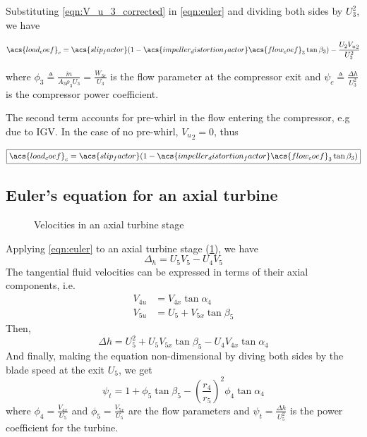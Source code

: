 \documentclass[tcc]{subfiles}
\begin{document}
Substituting \cref{eqn:V_u_3_corrected} in \cref{eqn:euler} and dividing both sides by ${U_3^2}$, we have

\begin{equation}
    \acs{load_coef}_c = \acs{slip_factor}(1-\acs{impeller_distortion_factor}\acs{flow_coef}_3\tan\beta_3) - \frac{U_2 {V_u}_2}{U_3^2} 
\end{equation}

where $\phi_3 \triangleq \frac{\dot{m}}{A_3 \rho_3 U_3} = \frac{W_{3r}}{U_3}$ is the flow parameter at the compressor exit
and $\psi_c \triangleq \frac{\Delta h}{U_3^2}$ is the compressor power coefficient.

The second term accounts for pre-whirl in the flow entering the compressor, e.g due to \ac{IGV}.
In the case of no pre-whirl, ${V_u}_2 = 0$, thus 

\begin{equation}
    \label{eqn:euler}
    \boxed{\acs{load_coef}_c = \acs{slip_factor}(1-\acs{impeller_distortion_factor}\acs{flow_coef}_3\tan\beta_3)}
\end{equation}

\subsection{Euler's equation for an axial turbine}

\begin{figure}
    \sffamily\small 
    \caption{Velocities in an axial turbine stage}
    \label{fig:turbine_euler}
    \hfill\hfill
\end{figure}

Applying \cref{eqn:euler} to an axial turbine stage (\cref{fig:turbine_euler}), we have
\begin{equation}
    \Delta_h = U_5V_5-U_4V_5
\end{equation}
The tangential fluid velocities can be expressed in terms of their axial components, i.e.\
\begin{align}
    V_{4u} &= V_{4x} \tan\alpha_4 \\
    V_{5u} &= U_5 + V_{5x} \tan\beta_5
\end{align}
Then,
\begin{equation}
    \Delta h = U_5^2 + U_5 V_{5x}\tan\beta_5 - U_4 V_{4x}\tan\alpha_4
\end{equation}
And finally, making the equation non-dimensional by diving both sides by the blade speed at the exit $U_5$, we get
\begin{equation}
    \boxed{\psi_t = 1 + \phi_5\tan\beta_5-\left(\frac{r_4}{r_5}\right)^2\phi_4\tan\alpha_4}
\end{equation}
where $\phi_4 = \frac{V_{4x}}{U_5}$ and $\phi_5 = \frac{V_{5x}}{U_5}$ are the flow parameters and
$\psi_t=\frac{\Delta h}{U_5^2}$ is the power coefficient for the turbine.
\end{document}
